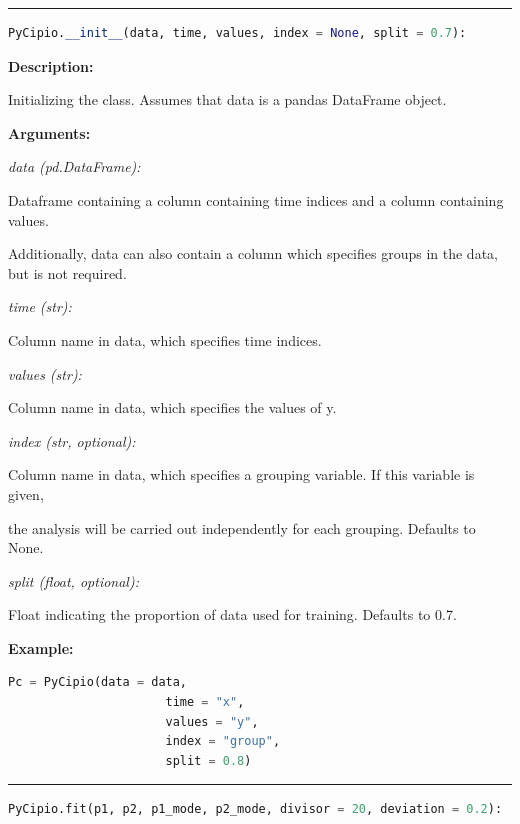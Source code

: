 \documentclass{article}
\begin{document}
\hrule

\begin{lstlisting}[language=Python]
PyCipio.__init__(data, time, values, index = None, split = 0.7):
\end{lstlisting}

\indent \textbf{Description:} 

\indent \indent Initializing the class. Assumes that data is a pandas DataFrame object.

\indent \textbf{Arguments:}

\indent \indent \textit{data (pd.DataFrame):} 

\indent \indent \indent Dataframe containing a column containing time indices and a column containing values. 

\indent \indent \indent Additionally, data can also contain a column which specifies groups in the data, but is not required. 

\indent \indent \textit{time (str):} 

\indent \indent \indent Column name in data, which specifies time indices.

\indent \indent \textit{values (str):} 

\indent \indent \indent Column name in data, which specifies the values of y.
            
\indent \indent \textit{index (str, optional):} 

\indent \indent \indent Column name in data, which specifies a grouping variable. If this variable is given, 

\indent \indent \indent the analysis will be carried out independently for each grouping. Defaults to None.

\indent \indent \textit{split (float, optional):} 

\indent \indent \indent Float indicating the proportion of data used for training. Defaults to 0.7.


\indent \textbf{Example:}
\begin{lstlisting}[language=Python]
		 Pc = PyCipio(data = data, 
                      time = "x", 
                      values = "y", 
                      index = "group", 
                      split = 0.8)

\end{lstlisting}

\hrule

\begin{lstlisting}[language=Python]
    PyCipio.fit(p1, p2, p1_mode, p2_mode, divisor = 20, deviation = 0.2):
\end{lstlisting}
\end{document}
